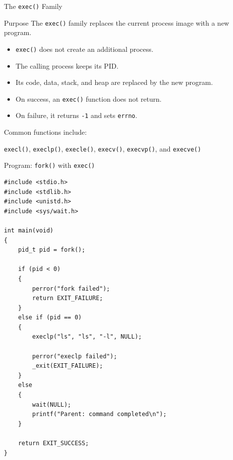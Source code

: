 \documentclass[aspectratio=169]{beamer}
\begin{document}
\begin{frame}{The \texttt{exec()} Family}

\begin{block}{Purpose}
The \texttt{exec()} family replaces the current process image with a new program.
\end{block}

\begin{itemize}
    \item \texttt{exec()} does not create an additional process.
    \item The calling process keeps its PID.
    \item Its code, data, stack, and heap are replaced by the new program.
    \item On success, an \texttt{exec()} function does not return.
    \item On failure, it returns \texttt{-1} and sets \texttt{errno}.
\end{itemize}

Common functions include:

\begin{center}
\texttt{execl()}, \texttt{execlp()}, \texttt{execle()},
\texttt{execv()}, \texttt{execvp()}, and \texttt{execve()}
\end{center}

\end{frame}

\begin{frame}[fragile]{Program: \texttt{fork()} with \texttt{exec()}}

\begin{lstlisting}[style=cstyle]
#include <stdio.h>
#include <stdlib.h>
#include <unistd.h>
#include <sys/wait.h>

int main(void)
{
    pid_t pid = fork();

    if (pid < 0)
    {
        perror("fork failed");
        return EXIT_FAILURE;
    }
    else if (pid == 0)
    {
        execlp("ls", "ls", "-l", NULL);

        perror("execlp failed");
        _exit(EXIT_FAILURE);
    }
    else
    {
        wait(NULL);
        printf("Parent: command completed\n");
    }

    return EXIT_SUCCESS;
}
\end{lstlisting}

\end{frame}
\end{document}
